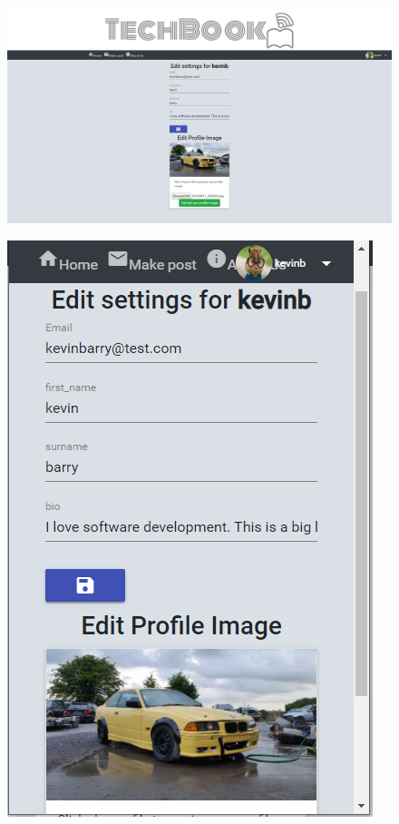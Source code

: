 \begin{figure}[H]
\centering
\begin{minipage}{.75\textwidth}
  \centering
  \includegraphics[width=.9\linewidth]{img/ui/settings_PC.PNG}
  \label{fig:settingsPC}
\end{minipage}%
\begin{minipage}{.25\textwidth}
  \centering
  \includegraphics[width=.9\linewidth]{img/ui/settings_MOBILE.PNG}
  \label{fig:settingsMOBILE}
\end{minipage}
\end{figure}

